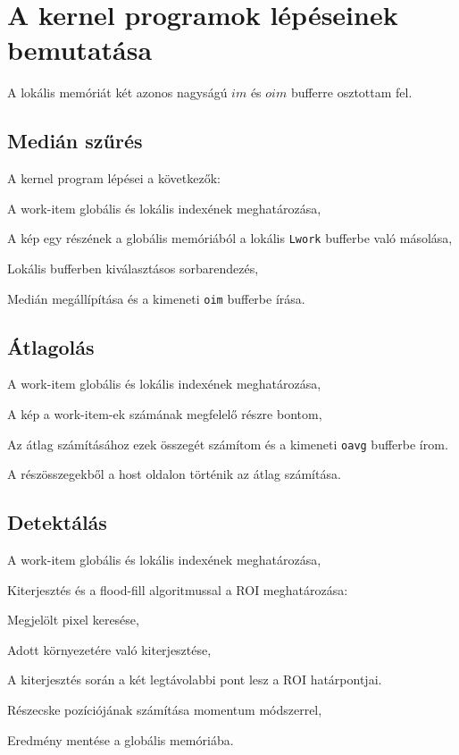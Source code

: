 \chapter{A kernel programok lépéseinek bemutatása}
A lokális memóriát két azonos nagyságú $im$ és $oim$ bufferre osztottam fel.

\section{Medián szűrés}
	\noindent A kernel program lépései a következők:
	\begin{enumerate*}
		\item A work-item globális és lokális indexének meghatározása,
		\item A kép egy részének a globális memóriából a lokális \texttt{Lwork} bufferbe való másolása,
		\item Lokális bufferben kiválasztásos sorbarendezés,
		\item Medián megállípítása és a kimeneti \texttt{oim} bufferbe írása.
	\end{enumerate*}

\section{Átlagolás}
	\begin{enumerate*}
		\item A work-item globális és lokális indexének meghatározása,
		\item A kép a work-item-ek számának megfelelő részre bontom,
		\item Az átlag számításához ezek összegét számítom és a kimeneti \texttt{oavg} bufferbe írom.
	\end{enumerate*}
	A részösszegekből a host oldalon történik az átlag számítása.

\section{Detektálás}
	\begin{enumerate*}
		\item A work-item globális és lokális indexének meghatározása,
		\item Kiterjesztés és a flood-fill algoritmussal a ROI meghatározása:
		\begin{enumerate*}
			\item Megjelölt pixel keresése,
			\item Adott környezetére való kiterjesztése,
			\item A kiterjesztés során a két legtávolabbi pont lesz a ROI határpontjai.
		\end{enumerate*}
		\item Részecske pozíciójának számítása momentum módszerrel,
		\item Eredmény mentése a globális memóriába.
	\end{enumerate*}

